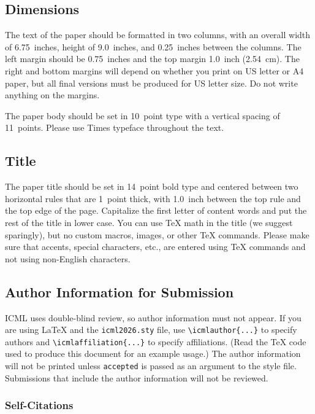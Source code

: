 \documentclass{article}
\theoremstyle{plain}
\theoremstyle{definition}
\theoremstyle{remark}
\begin{document}
\iffalse

\subsection{Dimensions}

The text of the paper should be formatted in two columns, with an
overall width of 6.75~inches, height of 9.0~inches, and 0.25~inches
between the columns. The left margin should be 0.75~inches and the top
margin 1.0~inch (2.54~cm). The right and bottom margins will depend on
whether you print on US letter or A4 paper, but all final versions
must be produced for US letter size.
Do not write anything on the margins.

The paper body should be set in 10~point type with a vertical spacing
of 11~points. Please use Times typeface throughout the text.

\subsection{Title}

The paper title should be set in 14~point bold type and centered
between two horizontal rules that are 1~point thick, with 1.0~inch
between the top rule and the top edge of the page. Capitalize the
first letter of content words and put the rest of the title in lower
case.
You can use TeX math in the title (we suggest sparingly),
but no custom macros, images, or other TeX commands.
Please make sure that accents, special characters, etc., are entered using
TeX commands and not using non-English characters.

\subsection{Author Information for Submission}
\label{author info}

ICML uses double-blind review, so author information must not appear. If
you are using \LaTeX\/ and the \texttt{icml2026.sty} file, use
\verb+\icmlauthor{...}+ to specify authors and \verb+\icmlaffiliation{...}+
to specify affiliations. (Read the TeX code used to produce this document for
an example usage.) The author information will not be printed unless
\texttt{accepted} is passed as an argument to the style file. Submissions that
include the author information will not be reviewed.

\subsubsection{Self-Citations}
\end{document}
